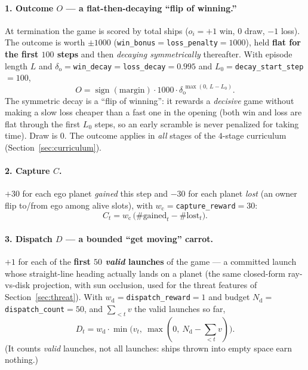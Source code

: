 \documentclass[11pt]{article}
\begin{document}
\paragraph{1. Outcome $O$ --- a flat-then-decaying ``flip of winning.''} At termination the game is
scored by total ships ($o_i=+1$ win, $0$ draw, $-1$ loss). The outcome is worth $\pm 1000$
(\texttt{win\_bonus}$=$\texttt{loss\_penalty}$=1000$), held \textbf{flat for the first $100$ steps} and
then \emph{decaying symmetrically} thereafter. With episode length $L$ and
$\delta_{\mathrm o}=$\texttt{win\_decay}$=$\texttt{loss\_decay}$=0.995$ and
$L_0=$\texttt{decay\_start\_step}$=100$,
\begin{equation}
O = \operatorname{sign}(\text{margin})\cdot 1000\cdot \delta_{\mathrm o}^{\,\max(0,\,L-L_0)}.
\label{eq:return}
\end{equation}
The symmetric decay is a ``flip of winning'': it rewards a \emph{decisive} game without making a slow
loss cheaper than a fast one in the opening (both win and loss are flat through the first $L_0$ steps,
so an early scramble is never penalized for taking time). Draw is $0$. The outcome applies in
\emph{all} stages of the $4$-stage curriculum (Section~\ref{sec:curriculum}).

\paragraph{2. Capture $C$.} $+30$ for each ego planet \emph{gained} this step and $-30$ for each planet
\emph{lost} (an owner flip to/from ego among alive slots), with $w_{\mathrm c}=$\texttt{capture\_reward}$=30$:
\begin{equation}
C_t = w_{\mathrm c}\,\big(\#\text{gained}_t - \#\text{lost}_t\big).
\end{equation}

\paragraph{3. Dispatch $D$ --- a bounded ``get moving'' carrot.} $+1$ for each of the \textbf{first $50$
\emph{valid} launches} of the game --- a committed launch whose straight-line heading actually lands on
a planet (the same closed-form ray-vs-disk projection, with sun occlusion, used for the threat features
of Section~\ref{sec:threat}). With $w_{\mathrm d}=$\texttt{dispatch\_reward}$=1$ and budget
$N_{\mathrm d}=$\texttt{dispatch\_count}$=50$, and $\sum_{<t}v$ the valid launches so far,
\begin{equation}
D_t = w_{\mathrm d}\cdot\min\!\big(v_t,\ \max(0,\ N_{\mathrm d}-\textstyle\sum_{<t}v)\big).
\end{equation}
(It counts \emph{valid} launches, not all launches: ships thrown into empty space earn nothing.)
\end{document}
